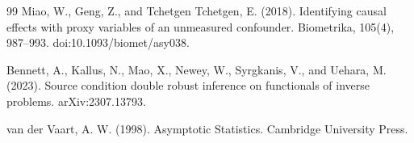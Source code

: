 \documentclass{article}
\begin{document}
\begin{thebibliography}{99}
   Miao, W., Geng, Z., and Tchetgen Tchetgen, E. (2018). Identifying causal effects with proxy variables of an unmeasured confounder. Biometrika, 105(4), 987--993. doi:10.1093/biomet/asy038.

   Bennett, A., Kallus, N., Mao, X., Newey, W., Syrgkanis, V., and Uehara, M. (2023). Source condition double robust inference on functionals of inverse problems. arXiv:2307.13793.

   van der Vaart, A. W. (1998). Asymptotic Statistics. Cambridge University Press.

\end{thebibliography}
\end{document}
